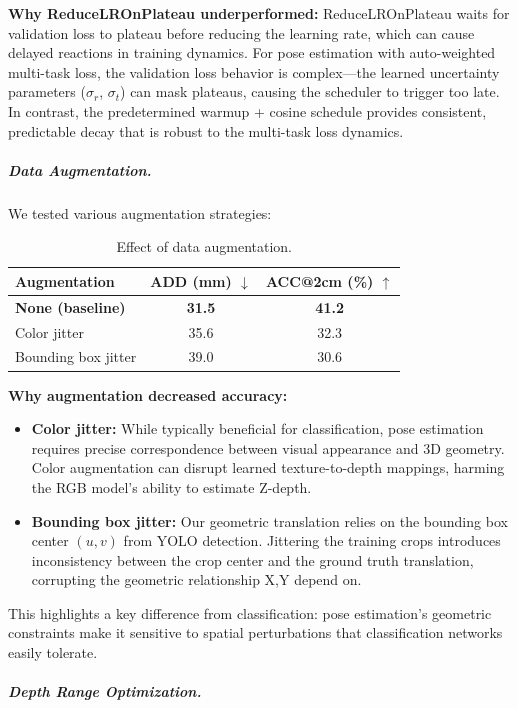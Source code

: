 \textbf{Why ReduceLROnPlateau underperformed:} ReduceLROnPlateau waits for validation loss to plateau before reducing the learning rate, which can cause delayed reactions in training dynamics. For pose estimation with auto-weighted multi-task loss, the validation loss behavior is complex---the learned uncertainty parameters ($\sigma_r$, $\sigma_t$) can mask plateaus, causing the scheduler to trigger too late. In contrast, the predetermined warmup + cosine schedule provides consistent, predictable decay that is robust to the multi-task loss dynamics.

\subparagraph{Data Augmentation.}

We tested various augmentation strategies:

\begin{table}[h]
\centering
\caption{Effect of data augmentation.}
\label{tab:ablation_aug}
\begin{tabular}{l|cc}
\toprule
Augmentation & ADD (mm) $\downarrow$ & ACC@2cm (\%) $\uparrow$ \\
\midrule
\textbf{None (baseline)} & \textbf{31.5} & \textbf{41.2} \\
Color jitter & 35.6 & 32.3 \\
Bounding box jitter & 39.0 & 30.6 \\
\bottomrule
\end{tabular}
\end{table}

\textbf{Why augmentation decreased accuracy:}
\begin{itemize}
    \item \textbf{Color jitter:} While typically beneficial for classification, pose estimation requires precise correspondence between visual appearance and 3D geometry. Color augmentation can disrupt learned texture-to-depth mappings, harming the RGB model's ability to estimate Z-depth.
    \item \textbf{Bounding box jitter:} Our geometric translation relies on the bounding box center $(u, v)$ from YOLO detection. Jittering the training crops introduces inconsistency between the crop center and the ground truth translation, corrupting the geometric relationship X,Y depend on.
\end{itemize}

This highlights a key difference from classification: pose estimation's geometric constraints make it sensitive to spatial perturbations that classification networks easily tolerate.

\subparagraph{Depth Range Optimization.}

